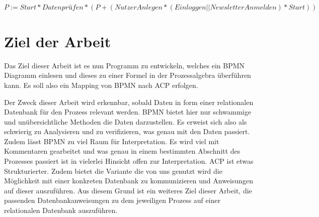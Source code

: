 $P:=Start*Datenprüfen*(P+(NutzerAnlegen*(Einloggen||NewsletterAnmelden)*Start)) $


\section {Ziel der Arbeit}

Das Ziel dieser Arbeit ist es nun Programm zu entwickeln, welches ein BPMN Diagramm einlesen und dieses zu einer Formel in der Prozessalgebra überführen kann. Es soll also ein Mapping von BPMN nach ACP erfolgen. 

Der Zweck dieser Arbeit wird erkennbar, sobald Daten in form einer relationalen Datenbank für den Prozess relevant werden. BPMN bietet hier nur schwammige und unübersichtliche Methoden die Daten darzustellen. Es erweist sich also als schwierig zu Analysieren und zu verifizieren, was genau mit den Daten passiert. Zudem lässt BPMN zu viel Raum für Interpretation. Es wird viel mit Kommentaren gearbeitet und was genau in einem bestimmten Abschnitt des Prozesses passiert ist in vielerlei Hinsicht offen zur Interpretation. ACP ist etwas Strukturierter. Zudem bietet die Variante die von uns genutzt wird die Möglichkeit mit einer konkreten Datenbank zu kommunizieren und Anweisungen auf dieser auszuführen. Aus diesem Grund ist ein weiteres Ziel dieser Arbeit, die passenden Datenbankanweisungen zu dem jeweiligen Prozess auf einer relationalen Datenbank auszuführen.





